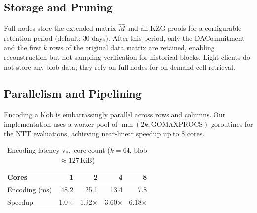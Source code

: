 \subsection{Storage and Pruning}

Full nodes store the extended matrix $\hat{M}$ and all KZG proofs for a configurable retention
period (default: 30 days). After this period, only the DACommitment and the first $k$ rows of
the original data matrix are retained, enabling reconstruction but not sampling verification
for historical blocks. Light clients do not store any blob data; they rely on full nodes for
on-demand cell retrieval.

\subsection{Parallelism and Pipelining}

Encoding a blob is embarrassingly parallel across rows and columns. Our implementation uses
a worker pool of $\min(2k, \text{GOMAXPROCS})$ goroutines for the NTT evaluations, achieving
near-linear speedup up to 8 cores.

\begin{table}[H]
\centering
\caption{Encoding latency vs.\ core count ($k = 64$, blob $\approx 127$\,KiB)}
\label{tab:encoding-parallel}
\begin{tabular}{lrrrr}
\toprule
\textbf{Cores} & 1 & 2 & 4 & 8 \\
\midrule
Encoding (ms) & 48.2 & 25.1 & 13.4 & 7.8 \\
Speedup & 1.0$\times$ & 1.92$\times$ & 3.60$\times$ & 6.18$\times$ \\
\bottomrule
\end{tabular}
\end{table}


